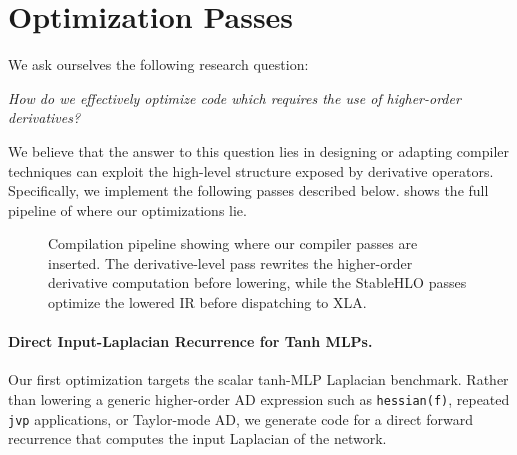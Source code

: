 \documentclass{article}
\theoremstyle{plain}
\theoremstyle{definition}
\theoremstyle{remark}
\begin{document}
\section{Optimization Passes}
We ask ourselves the following research question:

\emph{How do we effectively optimize code which requires the use of higher-order derivatives?}

We believe that the answer to this question lies in designing or
adapting compiler techniques can exploit the high-level structure
exposed by derivative operators. Specifically, we implement the following passes described below.  shows the full pipeline of where our optimizations lie.

\begin{figure}[t]
    \centering
    \caption{Compilation pipeline showing where our compiler passes are inserted. The derivative-level pass rewrites the higher-order derivative computation before lowering, while the StableHLO passes optimize the lowered IR before dispatching to XLA.}
    \label{fig:stablehlo-optimization-pipeline}
\end{figure}


\paragraph{Direct Input-Laplacian Recurrence for Tanh MLPs.}
Our first optimization targets the scalar tanh-MLP Laplacian benchmark.
Rather than lowering a generic higher-order AD expression such as
\texttt{hessian(f)}, repeated \texttt{jvp} applications, or Taylor-mode AD,
we generate code for a direct forward recurrence that computes the
input Laplacian of the network.
\end{document}

